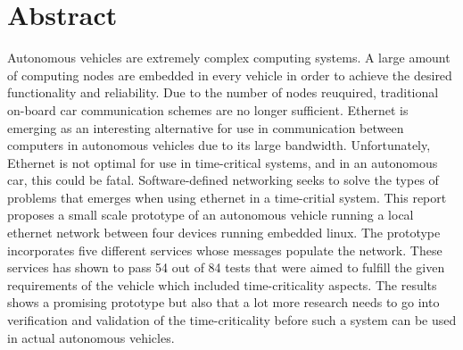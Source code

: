 \documentclass[11pt, titlepage]{article} %
\begin{document}

\clearpage
\section*{Abstract}
Autonomous vehicles are extremely complex computing systems. A large amount of computing
nodes are embedded in every vehicle in order to achieve the desired functionality and
reliability. Due to the number of nodes reuquired, traditional on-board car communication
schemes are no longer sufficient. Ethernet is emerging as an interesting alternative 
for use in communication between computers in autonomous vehicles due to its large bandwidth.
Unfortunately, Ethernet is not optimal for use in time-critical systems, and in an autonomous
car, this could be fatal. Software-defined networking seeks to solve the types of problems
that emerges when using ethernet in a time-critial system. This report proposes a small
scale prototype of an autonomous vehicle running a local ethernet network between four devices
running embedded linux. The prototype incorporates five different services whose messages
populate the network. These services has shown to pass 54 out of 84 tests that were aimed to fulfill
the given requirements of the vehicle which included time-criticality aspects. The results shows a
promising prototype but also that a lot more research needs to go into verification and validation of
the time-criticality before such a system can be used in actual autonomous vehicles.





\clearpage
\tableofcontents

\clearpage
\listoffigures

\clearpage
\listoftables

\clearpage
\end{document}
